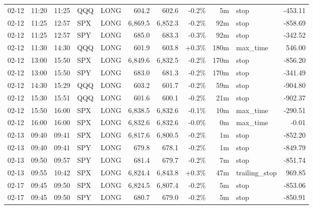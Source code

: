 \documentclass[11pt,a4paper,twoside]{article}
\begin{document}
\begin{center}
\begin{longtable}{>{\color{txtmain}}l l l l l r r r r >{\color{txtmain}}l r}
02-12 & 11:20 & 11:25 & QQQ & LONG & 604.2 & 602.6 & \textcolor{lossred}{-0.2\%} & 5m & stop & \textcolor{lossred}{-453.11} \\
02-12 & 11:25 & 12:57 & SPX & LONG & 6,869.5 & 6,852.3 & \textcolor{lossred}{-0.2\%} & 92m & stop & \textcolor{lossred}{-858.69} \\
02-12 & 11:25 & 12:57 & SPY & LONG & 685.0 & 683.3 & \textcolor{lossred}{-0.3\%} & 92m & stop & \textcolor{lossred}{-342.52} \\
02-12 & 11:30 & 14:30 & QQQ & LONG & 601.9 & 603.8 & \textcolor{wingreen}{+0.3\%} & 180m & max\_time & \textcolor{wingreen}{546.00} \\
02-12 & 13:00 & 15:50 & SPX & LONG & 6,849.6 & 6,832.5 & \textcolor{lossred}{-0.2\%} & 170m & stop & \textcolor{lossred}{-856.20} \\
02-12 & 13:00 & 15:50 & SPY & LONG & 683.0 & 681.3 & \textcolor{lossred}{-0.2\%} & 170m & stop & \textcolor{lossred}{-341.49} \\
02-12 & 14:30 & 15:29 & QQQ & LONG & 603.2 & 601.7 & \textcolor{lossred}{-0.2\%} & 59m & stop & \textcolor{lossred}{-904.80} \\
02-12 & 15:30 & 15:51 & QQQ & LONG & 601.6 & 600.1 & \textcolor{lossred}{-0.2\%} & 21m & stop & \textcolor{lossred}{-902.37} \\
02-12 & 15:50 & 16:00 & SPX & LONG & 6,838.5 & 6,832.6 & \textcolor{lossred}{-0.1\%} & 10m & max\_time & \textcolor{lossred}{-290.51} \\
02-12 & 16:00 & 16:00 & SPX & LONG & 6,832.6 & 6,832.6 & \textcolor{lossred}{-0.0\%} & 0m & max\_time & \textcolor{lossred}{-0.01} \\
02-13 & 09:40 & 09:41 & SPX & LONG & 6,817.6 & 6,800.5 & \textcolor{lossred}{-0.2\%} & 1m & stop & \textcolor{lossred}{-852.20} \\
02-13 & 09:40 & 09:41 & SPY & LONG & 679.8 & 678.1 & \textcolor{lossred}{-0.2\%} & 1m & stop & \textcolor{lossred}{-849.79} \\
02-13 & 09:50 & 09:57 & SPY & LONG & 681.4 & 679.7 & \textcolor{lossred}{-0.2\%} & 7m & stop & \textcolor{lossred}{-851.74} \\
02-13 & 09:55 & 10:42 & SPX & LONG & 6,824.4 & 6,843.8 & \textcolor{wingreen}{+0.3\%} & 47m & trailing\_stop & \textcolor{wingreen}{969.85} \\
02-17 & 09:45 & 09:50 & SPX & LONG & 6,824.5 & 6,807.4 & \textcolor{lossred}{-0.2\%} & 5m & stop & \textcolor{lossred}{-853.06} \\
02-17 & 09:45 & 09:50 & SPY & LONG & 680.7 & 679.0 & \textcolor{lossred}{-0.2\%} & 5m & stop & \textcolor{lossred}{-850.91} \\

\end{longtable}
\end{center}
\end{document}
